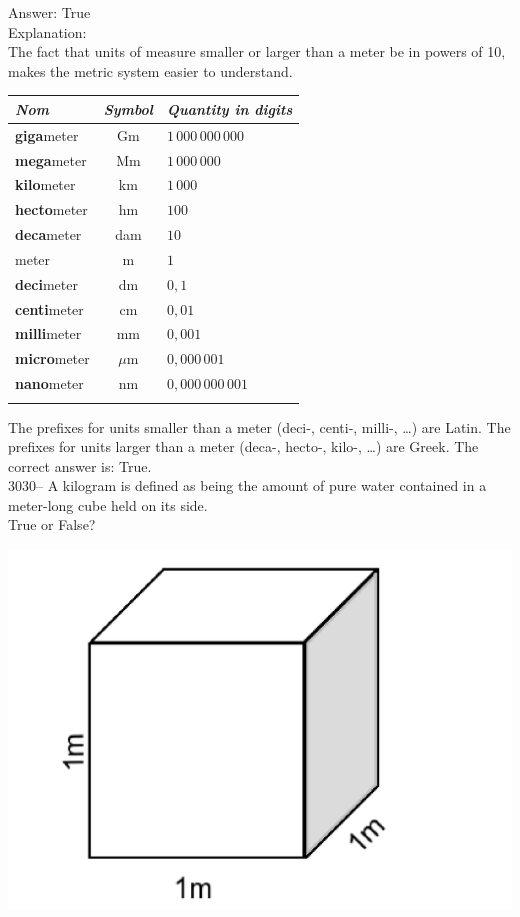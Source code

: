 \documentclass[letterpaper, 12pt]{article}
\begin{document}
Answer: True\\

Explanation:\\
The fact that units of measure smaller or larger than a meter be in powers of 10, makes the metric system easier to understand.\\

\begin{center}
\begin{tabular}{|l|c|l|} \hline
{\it Nom} & {\it Symbol} & {\it Quantity in digits}  \\ \hline \hline
\textbf{giga}meter & Gm & $1 \, 000 \, 000 \, 000$\\ \hline
\textbf{mega}meter & Mm & $1 \, 000 \, 000$\\ \hline
\textbf{kilo}meter & km & $1 \, 000$\\ \hline
\textbf{hecto}meter & hm & $100$\\ \hline
\textbf{deca}meter & dam & $10$\\ \hline
meter & m & $1$\\ \hline
\textbf{deci}meter & dm & $0,1$\\ \hline
\textbf{centi}meter & cm & $0,01$\\ \hline
\textbf{milli}meter & mm & $0,001$\\ \hline
\textbf{micro}meter & $\mu$m & $0,000 \, 001$\\ \hline
\textbf{nano}meter & nm & $0,000 \, 000 \, 001$\\ \hline
\multicolumn{3}{c}{}\\
\end{tabular}
\end{center}

The prefixes for units smaller than a meter (deci-, centi-, milli-, \dots) are Latin. The prefixes for units larger than a meter (deca-, hecto-, kilo-, \dots) are Greek. The correct answer is: True.\\



3030-- A kilogram is defined as being the amount of pure water contained in a meter-long cube held on its side.\\
True or False?\\
\begin{center}
\includegraphics[scale=0.3]{cube.eps}
\end{center}
\end{document}
